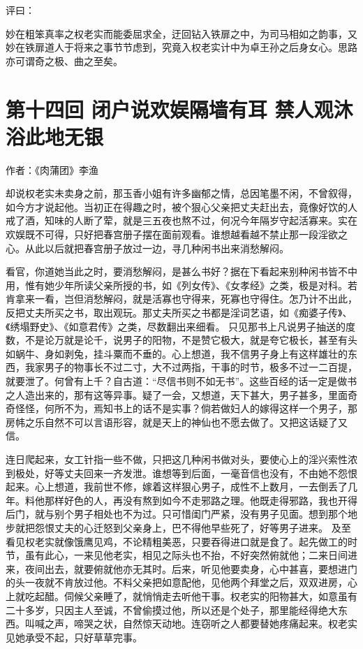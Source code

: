 \documentclass[a4paper,12pt,UTF8,twoside]{ctexbook}
\begin{document}
评曰：

妙在粗笨真率之权老实而能委屈求全，迂回钻入铁扉之中，为司马相如之韵事，又妙在铁扉道人于将来之事节节虑到，究竟入权老实计中为卓王孙之后身女心。思路亦可谓奇之极、曲之至矣。

\chapter{第十四回 闭户说欢娱隔墙有耳 禁人观沐浴此地无银}

作者：《肉蒲团》李渔

却说权老实未卖身之前，那玉香小姐有许多幽郁之情，总因笔墨不闲，不曾叙得，如今方才说起他。当初正在得趣之时，被个狠心父亲把丈夫赶出去，竟像好饮的人戒了酒，知味的人断了荤，就是三五夜也熬不过，何况今年隔岁守起活寡来。实在欢娱既不可得，只好把春宫册子摆在面前观看。谁想越看越不禁止那一段淫欲之心。从此以后就把春宫册子放过一边，寻几种闲书出来消愁解闷。

看官，你道她当此之时，要消愁解闷，是甚么书好？据在下看起来别种闲书皆不中用，惟有她少年所读父亲所授的书，如《列女传》、《女孝经》之类，极是对科。若肯拿来一看，岂但消愁解闷，就是活寡也守得来，死寡也守得住。怎乃计不出此，反把丈夫所买之书，取出观玩。那丈夫所买之书都是淫词艺语，如《痴婆子传》、《绣塌野史》、《如意君传》之类，尽数翻出来细看。 只见那书上凡说男子抽送的度数，不是论万就是论千，说男子的阳物，不是赞它极大，就是夸它极长，甚至有头如蜗牛、身如剥兔，挂斗粟而不垂的。心上想道，我不信男子身上有这样雄壮的东西，我家男子的物事长不过二寸，大不过两指，干事的时节，极多不过一二百提，就要泄了。何曾有上千？自古道：“尽信书则不如无书”。这些百经的话一定是做书之人造出来的，那有这等异事。疑了一会，又想道，天下甚大，男子甚多，里面奇奇怪怪，何所不为，焉知书上的话不是实事？倘若做妇人的嫁得这样一个男子，那房帏之乐自然不可以言语形容，就是天上的神仙也不愿去做了。又把这话疑了又信。

连日爬起来，女工针指一些不做，只把这几种闲书做对头，要使心上的淫兴索性浓到极处，好等丈夫回来一齐发泄。谁想等到后面，一毫音信也没有，不由她不怨恨起来。心上想道，我前世不修，嫁着这样狠心男子，成性不上数月，一去倒丢了几年。料他那样好色的人，再没有熬到如今不走邪路之理。他既走得邪路，我也开得后门，就与别个男子相处也不为过。只可惜闺门严紧，没有男子见面。想到那个地步就把怨恨丈夫的心迁怒到父亲身上，巴不得他早些死了，好等男子进来。 及至看见权老实就像饿鹰见鸡，不论精粗美恶，只要吞得进口就是食了。起先做工的时节，虽有此心，一来见他老实，相见之际头也不抬，不好突然俯就他；二来日间进来，夜间出去，就要俯就他亦无其时。后来，听见他要卖身，心中甚喜，要想进门的头一夜就不肯放过他。不料父亲把如意配他，见他两个拜堂之后，双双进房，心上就吃起醋。伺候父亲睡了，就悄悄走去听他干事。权老实的阳物甚大，如意虽有二十多岁，只因主人至诚，不曾偷摸过他，所以还是个处子，那里能经得绝大东西。叫喊之声，啼哭之状，自然惊天动地。连窃听之人都要替她疼痛起来。权老实见她承受不起，只好草草完事。
\end{document}
